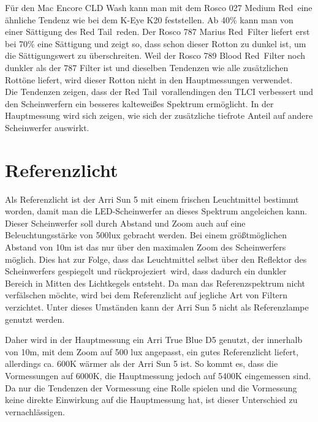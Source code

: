 
Für den Mac Encore CLD Wash kann man mit dem Rosco 027 \glqq Medium Red\grqq\ eine ähnliche Tendenz wie bei dem K-Eye K20 feststellen. Ab 40\% kann man von einer Sättigung des \glqq Red Tail\grqq\ reden. Der Rosco 787 \glqq Marius Red\grqq\ Filter liefert erst bei 70\% eine Sättigung und zeigt so, dass schon dieser Rotton zu dunkel ist, um die Sättigungswert zu überschreiten. Weil der Rosco 789 \glqq Blood Red\grqq\ Filter noch dunkler als der 787 Filter ist und dieselben Tendenzen wie alle zusätzlichen Rottöne liefert, wird dieser Rotton nicht in den Hauptmessungen verwendet. \\
Die Tendenzen zeigen, dass der \glqq Red Tail\grqq\ vorallendingen den TLCI verbessert und den Scheinwerfern ein besseres kalteweißes Spektrum ermöglicht. In der Hauptmessung wird sich zeigen, wie sich der zusätzliche tiefrote Anteil auf andere Scheinwerfer auswirkt.



\section{Referenzlicht}
\label{sec_reflicht}
Als Referenzlicht ist der Arri Sun 5 mit einem frischen Leuchtmittel bestimmt worden, damit man die LED-Scheinwerfer an dieses Spektrum angeleichen kann. Dieser Scheinwerfer soll durch Abstand und Zoom auch auf eine Beleuchtungsstärke von 500lux gebracht werden. Bei einem größtmöglichen Abstand von 10m ist das nur über den maximalen Zoom des Scheinwerfers möglich. Dies hat zur Folge, dass das Leuchtmittel selbst über den Reflektor des Scheinwerfers gespiegelt und \glqq rückprojeziert\grqq\ wird, dass dadurch ein dunkler Bereich in Mitten des Lichtkegels entsteht. Da man das Referenzspektrum nicht verfälschen möchte, wird bei dem Referenzlicht auf jegliche Art von Filtern verzichtet. Unter dieses Umständen kann der Arri Sun 5 nicht als Referenzlampe genutzt werden.

Daher wird in der Hauptmessung ein Arri True Blue D5 genutzt, der innerhalb von 10m, mit dem Zoom auf 500 lux angepasst, ein gutes Referenzlicht liefert, allerdings ca. 600K wärmer als der Arri Sun 5 ist. So kommt es, dass die Vormessungen auf 6000K, die Hauptmessung jedoch auf 5400K eingemessen sind. Da nur die Tendenzen der Vormessung eine Rolle spielen und die Vormessung keine direkte Einwirkung auf die Hauptmessung hat, ist dieser Unterschied zu vernachlässigen.


